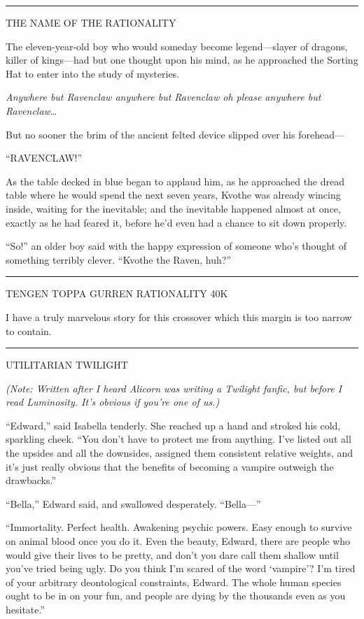 \begin{center}\rule{3in}{0.4pt}\end{center}

THE NAME OF THE RATIONALITY

The eleven-year-old boy who would someday become legend---slayer of
dragons, killer of kings---had but one thought upon his mind, as he
approached the Sorting Hat to enter into the study of mysteries.

\emph{Anywhere but Ravenclaw anywhere but Ravenclaw oh please anywhere
but Ravenclaw\ldots{}}

But no sooner the brim of the ancient felted device slipped over his
forehead---

``RAVENCLAW!''

As the table decked in blue began to applaud him, as he approached the
dread table where he would spend the next seven years, Kvothe was
already wincing inside, waiting for the inevitable; and the inevitable
happened almost at once, exactly as he had feared it, before he'd even
had a chance to sit down properly.

``So!'' an older boy said with the happy expression of someone who's
thought of something terribly clever. ``Kvothe the Raven, huh?''

\begin{center}\rule{3in}{0.4pt}\end{center}

TENGEN TOPPA GURREN RATIONALITY 40K

I have a truly marvelous story for this crossover which this margin is
too narrow to contain.

\begin{center}\rule{3in}{0.4pt}\end{center}

UTILITARIAN TWILIGHT

\emph{(Note: Written after I heard Alicorn was writing a Twilight
fanfic, but before I read Luminosity. It's obvious if you're one of
us.)}

``Edward,'' said Isabella tenderly. She reached up a hand and stroked
his cold, sparkling cheek. ``You don't have to protect me from anything.
I've listed out all the upsides and all the downsides, assigned them
consistent relative weights, and it's just really obvious that the
benefits of becoming a vampire outweigh the drawbacks.''

``Bella,'' Edward said, and swallowed desperately. ``Bella---''

``Immortality. Perfect health. Awakening psychic powers. Easy enough to
survive on animal blood once you do it. Even the beauty, Edward, there
are people who would give their lives to be pretty, and don't you dare
call them shallow until you've tried being ugly. Do you think I'm scared
of the word `vampire'? I'm tired of your arbitrary deontological
constraints, Edward. The whole human species ought to be in on your fun,
and people are dying by the thousands even as you hesitate.''

